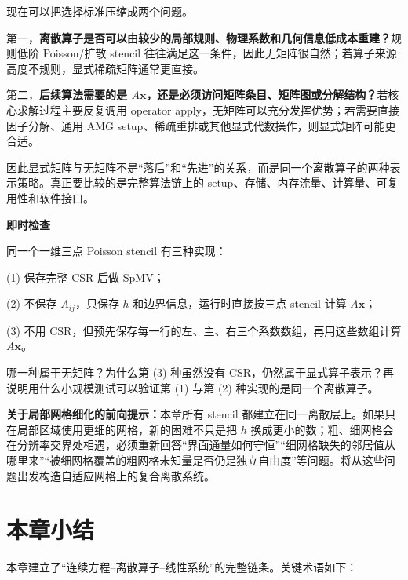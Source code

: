 现在可以把选择标准压缩成两个问题。

第一，\textbf{离散算子是否可以由较少的局部规则、物理系数和几何信息低成本重建？}规则低阶 Poisson/扩散 stencil 往往满足这一条件，因此无矩阵很自然；若算子来源高度不规则，显式稀疏矩阵通常更直接。

第二，\textbf{后续算法需要的是 $A\bm x$，还是必须访问矩阵条目、矩阵图或分解结构？}若核心求解过程主要反复调用 operator apply，无矩阵可以充分发挥优势；若需要直接因子分解、通用 AMG setup、稀疏重排或其他显式代数操作，则显式矩阵可能更合适。

因此显式矩阵与无矩阵不是“落后”和“先进”的关系，而是同一个离散算子的两种表示策略。真正要比较的是完整算法链上的 setup、存储、内存流量、计算量、可复用性和软件接口。

\begin{checkpointbox}
\textbf{即时检查}

同一个一维三点 Poisson stencil 有三种实现：

(1) 保存完整 CSR 后做 SpMV；

(2) 不保存 $A_{ij}$，只保存 $h$ 和边界信息，运行时直接按三点 stencil 计算 $A\bm x$；

(3) 不用 CSR，但预先保存每一行的左、主、右三个系数数组，再用这些数组计算 $A\bm x$。

哪一种属于无矩阵？为什么第 (3) 种虽然没有 CSR，仍然属于显式算子表示？再说明用什么小规模测试可以验证第 (1) 与第 (2) 种实现的是同一个离散算子。
\end{checkpointbox}

\begin{keybox}
\textbf{关于局部网格细化的前向提示：}本章所有 stencil 都建立在同一离散层上。如果只在局部区域使用更细的网格，新的困难不只是把 $h$ 换成更小的数；粗、细网格会在分辨率交界处相遇，必须重新回答“界面通量如何守恒”“细网格缺失的邻居值从哪里来”“被细网格覆盖的粗网格未知量是否仍是独立自由度”等问题。将从这些问题出发构造自适应网格上的复合离散系统。
\end{keybox}

\section{本章小结}

本章建立了“连续方程--离散算子--线性系统”的完整链条。关键术语如下：

